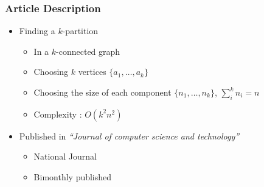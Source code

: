 \begin{frame}
  \frametitle{Article Description}
  \begin{itemize}
  \item Finding a $k$-partition
    \begin{itemize}
    \item In a $k$-connected graph
    \item Choosing $k$ vertices $\{a_1, \dots , a_k\}$
    \item Choosing the size of each component $\{n_1, \dots ,n_k\}$,
      $\sum\limits_{i}^k{n_i} = n$
    \item Complexity : $O(k^2 n^2)$
    \end{itemize}
  \item Published in {\em ``Journal of computer science and technology''}
    \begin{itemize}
    \item National Journal
    \item Bimonthly published
    \end{itemize}
  \end{itemize}
\end{frame}


